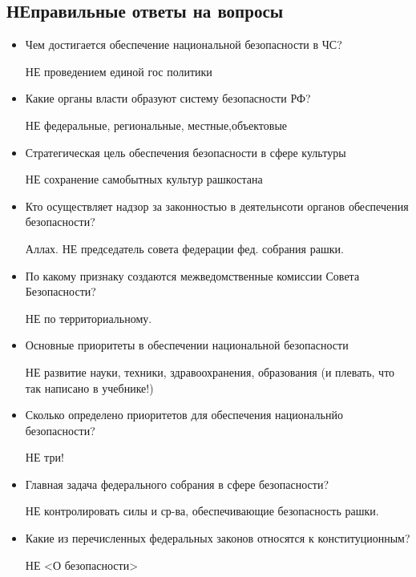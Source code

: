 \documentclass[oneside,final,14pt]{extreport}
\begin{document}
\subsection*{НЕправильные ответы на вопросы}

\begin{itemize}
	\item Чем достигается обеспечение национальной безопасности в ЧС?
	
	НЕ проведением единой гос политики
	
	\item Какие органы власти образуют систему безопасности РФ?
	
	НЕ федеральные, региональные, местные,объектовые
	
	\item Стратегическая цель обеспечения безопасности в сфере культуры
	
	НЕ сохранение самобытных культур рашкостана
	
	\item Кто осуществляет надзор за законностью в деятельнсоти органов обеспечения безопасности?
	
	Аллах. НЕ председатель  совета федерации фед. собрания рашки.
	
	\item По какому признаку создаются межведомственные комиссии Совета Безопасности?
	
	НЕ по территориальному.
	
	\item Основные приоритеты в обеспечении национальной безопасности
	
	НЕ развитие науки, техники, здравоохранения, образования (и плевать, что так написано в учебнике!)
	
	\item Сколько определено приоритетов для обеспечения национальнйо безопасности?
	
	НЕ три!
	
	\item Главная задача федерального собрания в сфере безопасности?
	
	НЕ контролировать силы и ср-ва, обеспечивающие безопасность рашки.
	
	\item Какие из перечисленных федеральных законов относятся к конституционным?
	
	НЕ <О безопасности>
	
	
	
	
	
	
\end{itemize}
\end{document}
